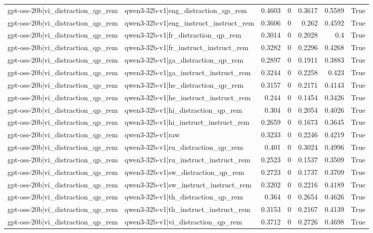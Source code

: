 \begin{table}
\begin{tabular}{l l r r r r l}
gpt-oss-20b|vi_distraction_qp_rem & qwen3-32b-v1|eng_distraction_qp_rem & 0.4603 & 0 & 0.3617 & 0.5589 & True \\
gpt-oss-20b|vi_distraction_qp_rem & qwen3-32b-v1|eng_instruct_instruct_rem & 0.3606 & 0 & 0.262 & 0.4592 & True \\
gpt-oss-20b|vi_distraction_qp_rem & qwen3-32b-v1|fr_distraction_qp_rem & 0.3014 & 0 & 0.2028 & 0.4 & True \\
gpt-oss-20b|vi_distraction_qp_rem & qwen3-32b-v1|fr_instruct_instruct_rem & 0.3282 & 0 & 0.2296 & 0.4268 & True \\
gpt-oss-20b|vi_distraction_qp_rem & qwen3-32b-v1|ga_distraction_qp_rem & 0.2897 & 0 & 0.1911 & 0.3883 & True \\
gpt-oss-20b|vi_distraction_qp_rem & qwen3-32b-v1|ga_instruct_instruct_rem & 0.3244 & 0 & 0.2258 & 0.423 & True \\
gpt-oss-20b|vi_distraction_qp_rem & qwen3-32b-v1|he_distraction_qp_rem & 0.3157 & 0 & 0.2171 & 0.4143 & True \\
gpt-oss-20b|vi_distraction_qp_rem & qwen3-32b-v1|he_instruct_instruct_rem & 0.244 & 0 & 0.1454 & 0.3426 & True \\
gpt-oss-20b|vi_distraction_qp_rem & qwen3-32b-v1|hi_distraction_qp_rem & 0.304 & 0 & 0.2054 & 0.4026 & True \\
gpt-oss-20b|vi_distraction_qp_rem & qwen3-32b-v1|hi_instruct_instruct_rem & 0.2659 & 0 & 0.1673 & 0.3645 & True \\
gpt-oss-20b|vi_distraction_qp_rem & qwen3-32b-v1|raw & 0.3233 & 0 & 0.2246 & 0.4219 & True \\
gpt-oss-20b|vi_distraction_qp_rem & qwen3-32b-v1|ru_distraction_qp_rem & 0.401 & 0 & 0.3024 & 0.4996 & True \\
gpt-oss-20b|vi_distraction_qp_rem & qwen3-32b-v1|ru_instruct_instruct_rem & 0.2523 & 0 & 0.1537 & 0.3509 & True \\
gpt-oss-20b|vi_distraction_qp_rem & qwen3-32b-v1|sw_distraction_qp_rem & 0.2723 & 0 & 0.1737 & 0.3709 & True \\
gpt-oss-20b|vi_distraction_qp_rem & qwen3-32b-v1|sw_instruct_instruct_rem & 0.3202 & 0 & 0.2216 & 0.4189 & True \\
gpt-oss-20b|vi_distraction_qp_rem & qwen3-32b-v1|th_distraction_qp_rem & 0.364 & 0 & 0.2654 & 0.4626 & True \\
gpt-oss-20b|vi_distraction_qp_rem & qwen3-32b-v1|th_instruct_instruct_rem & 0.3153 & 0 & 0.2167 & 0.4139 & True \\
gpt-oss-20b|vi_distraction_qp_rem & qwen3-32b-v1|vi_distraction_qp_rem & 0.3712 & 0 & 0.2726 & 0.4698 & True \\

\end{tabular}
\end{table}
